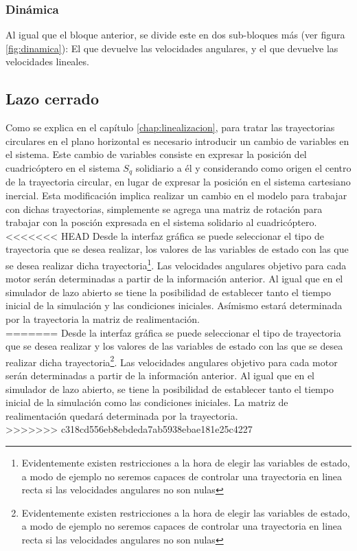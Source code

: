 \documentclass[main]{subfiles}
\begin{document}
\subsubsection{Din\'amica}

Al igual que el bloque anterior, se divide este en dos sub-bloques m\'as (ver figura \ref{fig:dinamica}): El que devuelve las velocidades angulares, y el que devuelve las velocidades lineales. 

\subsection{Lazo cerrado}

Como se explica en el cap\'itulo \ref{chap:linealizacion}, para tratar las trayectorias circulares en el plano horizontal es necesario introducir un cambio de variables en el sistema. Este cambio de variables consiste en expresar la posici\'on del cuadric\'optero en el sistema $S_q$ solidiario a \'el y considerando como origen el centro de la trayectoria circular, en lugar de expresar la posici\'on en el sistema cartesiano inercial. Esta modificaci\'on implica realizar un cambio en el modelo para trabajar con dichas trayectorias, simplemente se agrega una matriz de rotaci\'on para trabajar con la posci\'on expresada en el sistema solidario al cuadric\'optero.\\ 

<<<<<<< HEAD
Desde la interfaz gr\'afica se puede seleccionar el tipo de trayectoria que se desea realizar, los valores de las variables de estado con las que se desea realizar dicha trayectoria\footnote{Evidentemente existen restricciones a la hora de elegir las variables de estado, a modo de ejemplo no seremos capaces de controlar una trayectoria en linea recta si las velocidades angulares no son nulas}. Las velocidades angulares objetivo para cada motor ser\'an determinadas a partir de la informaci\'on anterior. Al igual que en el simulador de lazo abierto se tiene la posibilidad de establecer tanto el tiempo inicial de la simulaci\'on y las condiciones iniciales. As\'imismo estar\'a determinada por la trayectoria la matriz de realimentaci\'on.\\
=======
Desde la interfaz gr\'afica se puede seleccionar el tipo de trayectoria que se desea realizar y los valores de las variables de estado con las que se desea realizar dicha trayectoria\footnote{Evidentemente existen restricciones a la hora de elegir las variables de estado, a modo de ejemplo no seremos capaces de controlar una trayectoria en linea recta si las velocidades angulares no son nulas}. Las velocidades angulares objetivo para cada motor ser\'an determinadas a partir de la informaci\'on anterior. Al igual que en el simulador de lazo abierto, se tiene la posibilidad de establecer tanto el tiempo inicial de la simulaci\'on como las condiciones iniciales. La matriz de realimentaci\'on quedar\'a determinada por la trayectoria.\\
>>>>>>> c318cd556eb8ebdeda7ab5938ebae181e25c4227
\end{document}
